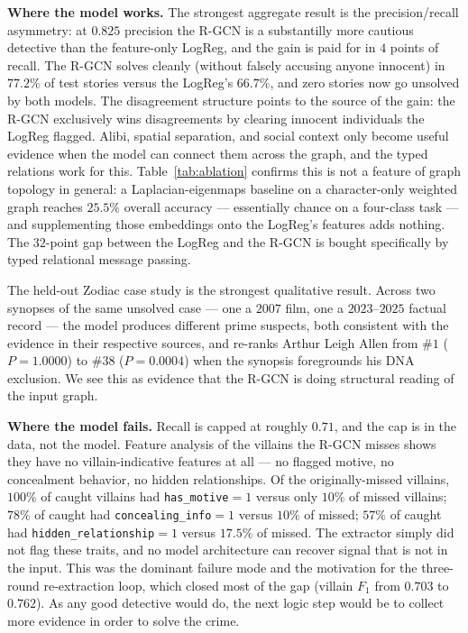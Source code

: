 \documentclass[11pt]{article}
\begin{document}
\textbf{Where the model works.} The strongest aggregate result is the precision/recall asymmetry: at $0.825$ precision the R-GCN is a substantilly more cautious detective than the feature-only LogReg, and the gain is paid for in $4$ points of recall. The R-GCN solves cleanly (without falsely accusing anyone innocent) in $77.2\%$ of test stories versus the LogReg's $66.7\%$, and zero stories now go unsolved by both models. The disagreement structure points to the source of the gain: the R-GCN exclusively wins disagreements by clearing innocent individuals the LogReg flagged. Alibi, spatial separation, and social context only become useful evidence when the model can connect them across the graph, and the typed relations work for this. Table~\ref{tab:ablation} confirms this is not a feature of graph topology in general: a Laplacian-eigenmaps baseline on a character-only weighted graph reaches $25.5\%$ overall accuracy --- essentially chance on a four-class task --- and supplementing those embeddings onto the LogReg's features adds nothing. The $32$-point gap between the LogReg and the R-GCN is bought specifically by typed relational message passing.

The held-out Zodiac case study is the strongest qualitative result. Across two synopses of the same unsolved case --- one a $2007$ film, one a $2023$--$2025$ factual record --- the model produces different prime suspects, both consistent with the evidence in their respective sources, and re-ranks Arthur Leigh Allen from \#$1$ ($P=1.0000$) to \#$38$ ($P=0.0004$) when the synopsis foregrounds his DNA exclusion. We see this as evidence that the R-GCN is doing structural reading of the input graph. 

\textbf{Where the model fails.} Recall is capped at roughly $0.71$, and the cap is in the data, not the model. Feature analysis of the villains the R-GCN misses shows they have no villain-indicative features at all --- no flagged motive, no concealment behavior, no hidden relationships. Of the originally-missed villains, $100\%$ of caught villains had \texttt{has\_motive}$=1$ versus only $10\%$ of missed villains; $78\%$ of caught had \texttt{concealing\_info}$=1$ versus $10\%$ of missed; $57\%$ of caught had \texttt{hidden\_relationship}$=1$ versus $17.5\%$ of missed. The extractor simply did not flag these traits, and no model architecture can recover signal that is not in the input. This was the dominant failure mode and the motivation for the three-round re-extraction loop, which closed most of the gap (villain $F_1$ from $0.703$ to $0.762$). As any good detective would do, the next logic step would be to collect more evidence in order to solve the crime.
\end{document}

